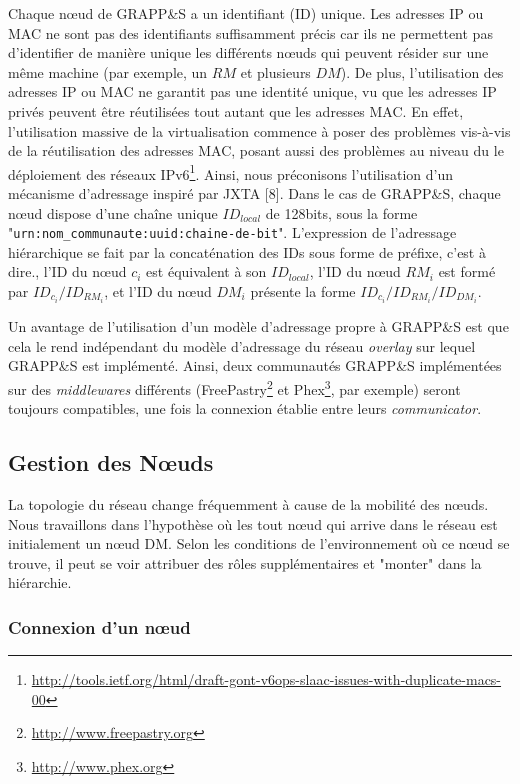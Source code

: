 Chaque n{\oe}ud de GRAPP\&S a un identifiant (ID) unique. Les adresses IP ou MAC ne sont pas des identifiants suffisamment précis car ils ne permettent pas d'identifier de manière unique les différents n{\oe}uds qui peuvent résider sur une même machine (par exemple, un $RM$ et plusieurs $DM$). De plus, l'utilisation des adresses IP ou MAC ne garantit pas une identité unique, vu que les adresses IP privés peuvent être réutilisées tout autant que les adresses MAC. En effet, l'utilisation massive de la virtualisation commence à poser des problèmes vis-à-vis de la réutilisation des adresses MAC, posant aussi des problèmes au niveau du le déploiement des réseaux IPv6\footnote{\url{http://tools.ietf.org/html/draft-gont-v6ops-slaac-issues-with-duplicate-macs-00}}. Ainsi, nous préconisons l'utilisation d'un mécanisme d'adressage inspiré par JXTA [8]. Dans le cas de GRAPP\&S, chaque n{\oe}ud dispose d'une chaîne unique $ID_{local}$ de 128bits, sous la forme "\texttt{urn:nom\_communaute:uuid:chaine-de-bit}". L'expression de l'adressage hiérarchique se fait par la concaténation des IDs sous forme de préfixe, c'est à dire., l'ID du n{\oe}ud $c_i$ est équivalent à son $ID_{local}$, l'ID du n{\oe}ud $RM_i$ est formé par $ID_{c_i}/ID_{RM_i}$, et l'ID du n{\oe}ud $DM_i$ présente la forme $ID_{c_i}/ID_{RM_i}/ID_{DM_i}$.

Un avantage de l'utilisation d'un modèle d'adressage propre à GRAPP\&S est que cela le rend indépendant du modèle d'adressage du réseau \textit{overlay} sur lequel GRAPP\&S est implémenté. Ainsi, deux communautés GRAPP\&S implémentées sur des \textit{middlewares} différents (FreePastry\footnote{\url{http://www.freepastry.org}} et Phex\footnote{\url{http://www.phex.org}}, par exemple) seront toujours compatibles, une fois la connexion établie entre leurs \textit{communicator}. 

\subsection{Gestion des N{\oe}uds}
La topologie du réseau change fréquemment à cause de la mobilité des n{\oe}uds. Nous travaillons dans l'hypothèse où les tout n{\oe}ud qui arrive dans le réseau est initialement un n{\oe}ud DM. Selon les conditions de l'environnement où ce n{\oe}ud se trouve, il peut se voir attribuer des rôles supplémentaires et "monter" dans la hiérarchie.

\subsubsection*{Connexion d'un n{\oe}ud}

